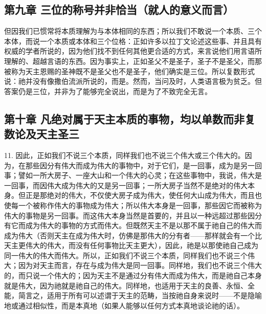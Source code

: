 
\subsection{第九章 三位的称号并非恰当（就人的意义而言）}

但因我们已惯常将本质理解为与本体相同的东西；所以我们不敢说一个本质、三个本体，而说一个本质或本体和三个位格：正如许多以拉丁文论述这些事、并且具有权威的学者所说的，因为他们找不到任何其他更合适的方式，来言说他们用言语所理解的、超越言语的东西。因为事实上，正如圣父不是圣子，圣子不是圣父，而那被称为天主恩赐的圣神既不是圣父也不是圣子，他们确实是三位。所以复数形式说：祂并没有像撒伯流派所说的，而是。然而，当问及时，人类语言极为贫乏。但答案仍是三位，并非为了能够完全说出，而是为了不致完全无言。\par


\subsection{第十章 凡绝对属于天主本质的事物，均以单数而非复数论及天主圣三}

11. 因此，正如我们不说三个本质，同样我们也不说三个伟大或三个伟大的。因为，在那些因分有伟大而成为伟大的事物中，对于它们，是一回事，成为是另一回事；譬如一所大房子、一座大山和一个伟大的心灵；在这些事物中，我说，伟大是一回事，而因伟大成为伟大的又是另一回事；一所大房子当然不是绝对的伟大本身。但正是那绝对的伟大，不仅使大房子成为伟大，使任何大山成为伟大，而且也使每一个被称作伟大的事物成为伟大；所以伟大本身是一回事，那些因它而被称为伟大的事物是另一回事。而这伟大本身当然是首要的，并且以一种远超过那些因分有它而成为伟大的事物的方式而伟大。但既然天主不是以那不属于祂自己的伟大而成为伟大（否则天主在成为伟大时，仿佛是那伟大的分有者——那样就会有一个比天主更伟大的伟大，而没有任何事物比天主更大），因此，祂是以那使祂自己成为同一伟大的伟大而伟大。所以，正如我们不说三个本质，同样我们也不说三个伟大；因为对天主而言，存在与成为伟大是同一回事。同样地，我们也不说三个伟大的，而只说一个伟大的；因为天主不是通过分有伟大而成为伟大，而是祂自己本身就是伟大，因为祂就是祂自己的伟大。同样地，也适用于天主的良善、永恒、全能，简言之，适用于所有可以述谓于天主的范畴，当按祂自身来说时——不是隐喻地或通过相似性，而是本真地（如果人能够以任何方式本真地谈论祂的话）。\par

